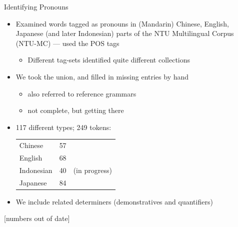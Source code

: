 \documentclass{beamer}
\begin{document}
    \begin{frame}{Identifying Pronouns}
    \begin{itemize}
       \item Examined words tagged as pronouns in (Mandarin) Chinese, English,
         Japanese (and later Indonesian) parts of the NTU Multilingual
         Corpus (NTU-MC) --- used the POS tags
         \begin{itemize}
         \item Different tag-sets identified quite different collections
         \end{itemize}
       \item We took the union, and filled in missing entries by hand
         \begin{itemize}
         \item also referred to reference grammars
         \item not complete, but getting there 
         \end{itemize}
       \item 117 different types; 249 tokens:
         \begin{tabular}[t]{lrl}
           Chinese & 57\\
           English & 68\\
           Indonesian & 40 & (in progress)\\
           Japanese & 84 
         \end{tabular}
       \item We include related determiners (demonstratives and quantifiers)
       \end{itemize}
[numbers out of date]
     \end{frame}
     
\end{document}
